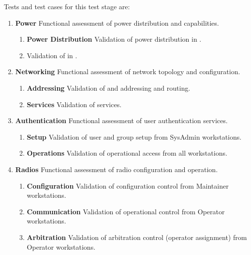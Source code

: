 Tests and test cases for this test stage are:
\begin{enumerate}[itemindent=5pt,topsep=0pt,itemsep=0pt,partopsep=0pt, parsep=0pt]
	
	\item {\bf Power} Functional assessment of power distribution and \UPS capabilities.
	\begin{enumerate}[itemindent=5pt,topsep=0pt,itemsep=0pt,partopsep=0pt, parsep=0pt]
		\item {\bf Power Distribution} Validation of power distribution in \ThisSys.
		\item {\bf \UPS} Validation of \UPS in \ThisSys.
	\end{enumerate}
	
	\item {\bf Networking} Functional assessment of network topology and configuration.
	\begin{enumerate}[itemindent=5pt,topsep=0pt,itemsep=0pt,partopsep=0pt, parsep=0pt]
		\item {\bf \IP Addressing} Validation of \IPvFour and \IPvSix addressing and routing.
		\item {\bf \NTP Services} Validation of \NTP services.
	\end{enumerate}
	
	\item {\bf Authentication} Functional assessment of user authentication services.
	\begin{enumerate}[itemindent=5pt,topsep=0pt,itemsep=0pt,partopsep=0pt, parsep=0pt]
		\item {\bf Setup} Validation of user and group setup from SysAdmin workstations.
		\item {\bf Operations} Validation of operational access from all workstations.
	\end{enumerate}
	
	\item {\bf Radios} Functional assessment of radio configuration and operation.
	\begin{enumerate}[itemindent=5pt,topsep=0pt,itemsep=0pt,partopsep=0pt, parsep=0pt]
		\item {\bf Configuration} Validation of configuration control from Maintainer workstations.
		\item {\bf Communication} Validation of operational control from Operator workstations.
		\item {\bf Arbitration} Validation of arbitration control (operator assignment) from Operator workstations.
	\end{enumerate}
	

\end{enumerate}
